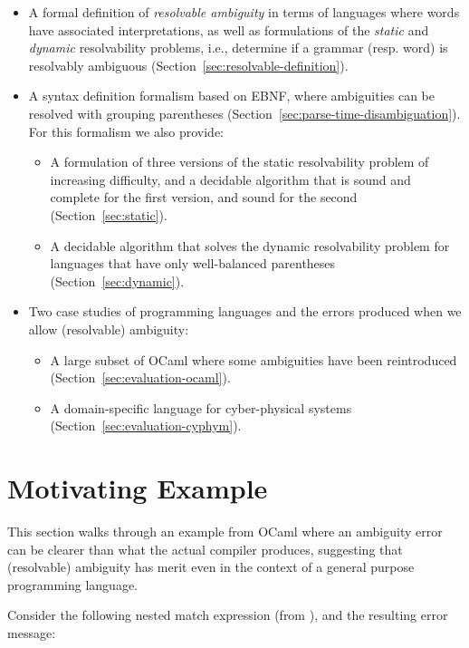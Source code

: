 \documentclass[acmsmall,review,anonymous]{acmart}\settopmatter{printfolios=true,printccs=false,printacmref=false}
\begin{document}
\begin{itemize}
\item A formal definition of \emph{resolvable ambiguity} in terms of languages where words have associated interpretations, as well as formulations of the \emph{static} and \emph{dynamic} resolvability problems, i.e., determine if a grammar (resp. word) is resolvably ambiguous (Section~\ref{sec:resolvable-definition}).
\item A syntax definition formalism based on EBNF, where ambiguities can be resolved with grouping parentheses (Section~\ref{sec:parse-time-disambiguation}). For this formalism we also provide:
  \begin{itemize}
  \item A formulation of three versions of the static resolvability problem of increasing difficulty, and a decidable algorithm that is sound and complete for the first version, and sound for the second (Section~\ref{sec:static}).
  \item A decidable algorithm that solves the dynamic resolvability problem for languages that have only well-balanced parentheses (Section~\ref{sec:dynamic}).
  \end{itemize}
\item Two case studies of programming languages and the errors produced when we allow (resolvable) ambiguity:
  \begin{itemize}
  \item A large subset of OCaml where some ambiguities have been reintroduced (Section~\ref{sec:evaluation-ocaml}).
  \item A domain-specific language for cyber-physical systems (Section~\ref{sec:evaluation-cyphym}).
  \end{itemize}
\end{itemize}

\section{Motivating Example}

This section walks through an example from OCaml where an ambiguity error can be clearer than what the actual compiler produces, suggesting that (resolvable) ambiguity has merit even in the context of a general purpose programming language.

Consider the following nested match expression (from \cite{palmkvistCreatingDomainSpecificLanguages2019}), and the resulting error message:
\end{document}
